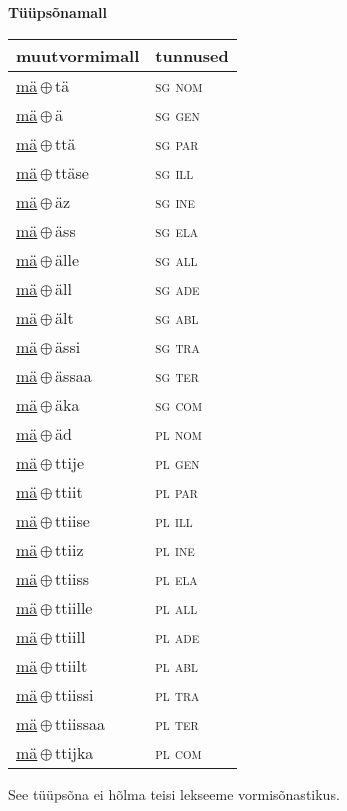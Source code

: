 

\vspace{3.5em}
\noindent \begin{minipage}{\textwidth}
\noindent \textbf{Tüüpsõnamall \,}\\

\begin{sideways}
\begin{tabular}{l l}
muutvormimall & tunnused \\
\hline
\underline{mä}\,$\oplus$\,tä & \textsc{ sg nom } \\
\underline{mä}\,$\oplus$\,ä & \textsc{ sg gen } \\
\underline{mä}\,$\oplus$\,ttä & \textsc{ sg par } \\
\underline{mä}\,$\oplus$\,ttäse & \textsc{ sg ill } \\
\underline{mä}\,$\oplus$\,äz & \textsc{ sg ine } \\
\underline{mä}\,$\oplus$\,äss & \textsc{ sg ela } \\
\underline{mä}\,$\oplus$\,älle & \textsc{ sg all } \\
\underline{mä}\,$\oplus$\,äll & \textsc{ sg ade } \\
\underline{mä}\,$\oplus$\,ält & \textsc{ sg abl } \\
\underline{mä}\,$\oplus$\,ässi & \textsc{ sg tra } \\
\underline{mä}\,$\oplus$\,ässaa & \textsc{ sg ter } \\
\underline{mä}\,$\oplus$\,äka & \textsc{ sg com } \\
\underline{mä}\,$\oplus$\,äd & \textsc{ pl nom } \\
\underline{mä}\,$\oplus$\,ttije & \textsc{ pl gen } \\
\underline{mä}\,$\oplus$\,ttiit & \textsc{ pl par } \\
\underline{mä}\,$\oplus$\,ttiise & \textsc{ pl ill } \\
\underline{mä}\,$\oplus$\,ttiiz & \textsc{ pl ine } \\
\underline{mä}\,$\oplus$\,ttiiss & \textsc{ pl ela } \\
\underline{mä}\,$\oplus$\,ttiille & \textsc{ pl all } \\
\underline{mä}\,$\oplus$\,ttiill & \textsc{ pl ade } \\
\underline{mä}\,$\oplus$\,ttiilt & \textsc{ pl abl } \\
\underline{mä}\,$\oplus$\,ttiissi & \textsc{ pl tra } \\
\underline{mä}\,$\oplus$\,ttiissaa & \textsc{ pl ter } \\
\underline{mä}\,$\oplus$\,ttijka & \textsc{ pl com } \\
\end{tabular}
\end{sideways}
\label{tab:tüüpsõnamall-mätä}

\end{minipage}

 
\vspace{1em}
\noindent See tüüpsõna ei hõlma teisi lekseeme vormi\-sõnastikus.
